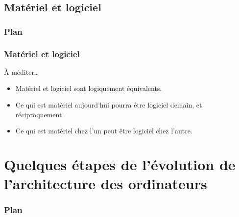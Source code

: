 \documentclass[utf8,10pt]{beamer}
\begin{document}
\subsection{Matériel et logiciel}

\begin{frame}

	\frametitle{Plan}
	
	\tableofcontents[currentsubsection]
\end{frame}

\begin{frame}
    \frametitle{Matériel et logiciel}
    
    \begin{exampleblock}{À méditer\ldots}
    \begin{itemize}
        \item Matériel et logiciel sont logiquement équivalents.
        
        \item Ce qui est matériel aujourd'hui pourra être logiciel demain, et réciproquement.
        
        \item Ce qui est matériel chez l'un peut être logiciel chez l'autre.
    \end{itemize}
     
    \end{exampleblock}
    
    

\end{frame}


\section{Quelques étapes de l'évolution de l'architecture des ordinateurs}

\begin{frame}

	\frametitle{Plan}
	
	\tableofcontents[currentsection]
\end{frame}

\end{document}
